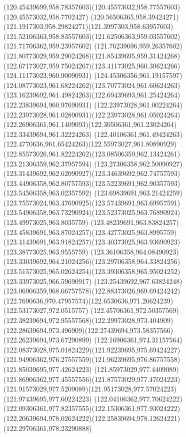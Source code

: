 {{	\curveto(120.45439699,958.78357603)(120.45573032,958.77557603)(120.45573032,958.7702427)
	\curveto(120.56506365,958.39424271)(121.1917303,958.29824271)(121.3997303,958.63957603)
	\curveto(121.52106363,958.83557603)(121.62506363,959.03557602)(121.71706362,959.23957602)
	\curveto(121.76239696,959.26357602)(121.80773029,959.29024268)(121.85439695,959.31424268)
	\curveto(122.67173027,959.75024267)(123.41173025,960.30624266)(124.11173023,960.90090931)
	\curveto(124.45306356,961.19157597)(124.08773023,961.68224262)(123.70773024,961.60624263)
	\curveto(123.16239692,961.49824263)(122.69439693,961.25424264)(122.23839694,960.97690931)
	\curveto(122.23973028,961.00224264)(122.23973028,961.02890931)(122.23973028,961.05024264)
	\curveto(122.26906361,961.1409093)(122.30506361,961.23024264)(122.33439694,961.32224263)
	\curveto(122.40106361,961.49424263)(122.4770636,961.65424263)(122.55973027,961.80890929)
	\curveto(122.85573026,961.82224262)(123.08506359,962.13424261)(123.21306359,962.37957594)
	\curveto(123.27306358,962.50090927)(123.31439692,962.62090927)(123.34639692,962.74757593)
	\curveto(123.44906358,962.80757593)(123.52239691,962.90357593)(123.54506358,963.02357592)
	\curveto(123.69839691,963.21424259)(123.75573024,963.47690925)(123.57439691,963.69957591)
	\curveto(123.54906358,963.73290924)(123.52373025,963.76890924)(123.49973025,963.8035759)
	\curveto(123.48239691,963.83824257)(123.45839691,963.87024257)(123.42773025,963.8995759)
	\curveto(123.41439691,963.91824257)(123.40373025,963.93690923)(123.38773025,963.9555759)
	\curveto(123.36106358,964.08490923)(123.33039692,964.21024256)(123.29706358,964.33824256)
	\curveto(123.51573025,965.02624254)(123.39306358,965.95024252)(123.33973025,966.59690917)
	\curveto(123.25439692,967.63824248)(123.06906359,968.66757578)(122.88373026,969.69424242)
	\curveto(122.7690636,970.47957574)(122.6530636,971.26624239)(122.53173027,972.0515757)
	\curveto(122.45706361,972.50357569)(122.38239694,972.95557568)(122.29973028,973.404909)
	\curveto(122.28639694,973.496909)(122.27439694,973.58357566)(122.26239694,973.67290899)
	\curveto(122.16906361,974.31157564)(122.08373028,975.01824229)(121.92239695,975.69424227)
	\curveto(121.94906362,976.27557559)(121.96239695,976.86757558)(121.85039695,977.42624223)
	\curveto(121.85973029,977.4409089)(121.86906362,977.45557556)(121.87573029,977.47024223)
	\curveto(121.91573029,977.5209089)(121.95173028,977.57024223)(121.97439695,977.60224223)
	\curveto(122.04106362,977.70624222)(122.09306361,977.82357555)(122.15306361,977.93024222)
	\curveto(122.20639694,978.02624222)(122.25839694,978.12624221)(122.29706361,978.23290888)
}}
